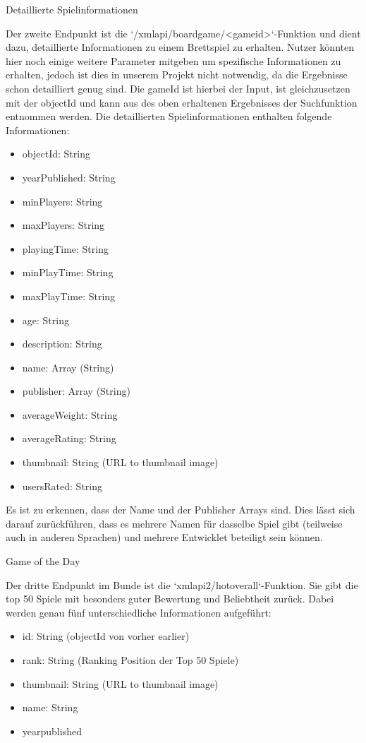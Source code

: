  \large Detaillierte Spielinformationen

Der zweite Endpunkt ist die `/xmlapi/boardgame/<gameid>`-Funktion und dient dazu,
detaillierte Informationen zu einem Brettspiel zu erhalten. Nutzer könnten hier noch einige weitere Parameter mitgeben um spezifische Informationen zu erhalten, jedoch ist dies in unserem Projekt nicht notwendig, da die Ergebnisse schon detailliert genug sind.
Die gameId ist hierbei der Input, ist gleichzusetzen mit der objectId und kann aus des oben erhaltenen Ergebnisses der Suchfunktion entnommen werden.
Die detaillierten Spielinformationen enthalten folgende Informationen:
\begingroup
\setlength{\itemsep}{-1pt} %
\setlength{\parskip}{-1pt} %
\begin{itemize}
    \item objectId: String
    \item yearPublished: String
    \item minPlayers: String
    \item maxPlayers: String
    \item playingTime: String
    \item minPlayTime: String
    \item maxPlayTime: String
    \item age: String
    \item description: String
    \item name: Array (String)
    \item publisher: Array (String)
    \item averageWeight: String
    \item averageRating: String
    \item thumbnail: String (URL to thumbnail image)
    \item usersRated: String
\end{itemize}
\endgroup

Es ist zu erkennen, dass der Name und der Publisher Arrays sind. Dies lässt sich darauf zurückführen, dass es mehrere Namen für dasselbe Spiel gibt (teilweise auch in anderen Sprachen) und mehrere Entwicklet beteiligt sein können.

\large Game of the Day

Der dritte Endpunkt im Bunde ist die `xmlapi2/hotoverall`-Funktion. Sie gibt die top 50 Spiele mit besonders guter Bewertung und Beliebtheit zurück.
Dabei werden genau fünf unterschiedliche Informationen aufgeführt:
\setlength{\itemsep}{-1pt}
\setlength{\parskip}{-1pt}
\begin{itemize}
    \item id: String (objectId von vorher earlier)
    \item rank: String (Ranking Position der Top 50 Spiele)
    \item thumbnail: String (URL to thumbnail image)
    \item name:  String        
    \item yearpublished 
\end{itemize}

